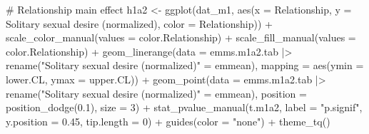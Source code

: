 \documentclass[
  bookmarksnumbered]{article}
\newenvironment{Shaded}{\begin{snugshade}}{\end{snugshade}}
\newcommand{\AttributeTok}[1]{\textcolor[rgb]{0.80,0.80,0.80}{#1}}
\newcommand{\CommentTok}[1]{\textcolor[rgb]{0.50,0.62,0.50}{#1}}
\newcommand{\DecValTok}[1]{\textcolor[rgb]{0.86,0.86,0.80}{#1}}
\newcommand{\FloatTok}[1]{\textcolor[rgb]{0.75,0.75,0.82}{#1}}
\newcommand{\FunctionTok}[1]{\textcolor[rgb]{0.94,0.94,0.56}{#1}}
\newcommand{\NormalTok}[1]{\textcolor[rgb]{0.80,0.80,0.80}{#1}}
\newcommand{\OtherTok}[1]{\textcolor[rgb]{0.94,0.94,0.56}{#1}}
\newcommand{\SpecialCharTok}[1]{\textcolor[rgb]{0.86,0.64,0.64}{#1}}
\newcommand{\StringTok}[1]{\textcolor[rgb]{0.80,0.58,0.58}{#1}}
\begin{document}
\begin{Shaded}
\begin{Highlighting}[]
\CommentTok{\# Relationship main effect}
\NormalTok{h1a2 }\OtherTok{\textless{}{-}} \FunctionTok{ggplot}\NormalTok{(dat\_m1, }\FunctionTok{aes}\NormalTok{(}\AttributeTok{x =}\NormalTok{ Relationship, }\AttributeTok{y =} \StringTok{\textasciigrave{}}\AttributeTok{Solitary sexual desire (normalized)}\StringTok{\textasciigrave{}}\NormalTok{, }
                          \AttributeTok{color =}\NormalTok{ Relationship)) }\SpecialCharTok{+}
  \FunctionTok{scale\_color\_manual}\NormalTok{(}\AttributeTok{values =}\NormalTok{ color.Relationship) }\SpecialCharTok{+}
  \FunctionTok{scale\_fill\_manual}\NormalTok{(}\AttributeTok{values =}\NormalTok{ color.Relationship) }\SpecialCharTok{+}
  \FunctionTok{geom\_linerange}\NormalTok{(}\AttributeTok{data =}\NormalTok{ emms.m1a2.tab }\SpecialCharTok{|\textgreater{}} 
                  \FunctionTok{rename}\NormalTok{(}\StringTok{"Solitary sexual desire (normalized)"} \OtherTok{=}\NormalTok{ emmean),}
                \AttributeTok{mapping =} \FunctionTok{aes}\NormalTok{(}\AttributeTok{ymin =}\NormalTok{ lower.CL, }\AttributeTok{ymax =}\NormalTok{ upper.CL)) }\SpecialCharTok{+}
  \FunctionTok{geom\_point}\NormalTok{(}\AttributeTok{data =}\NormalTok{ emms.m1a2.tab }\SpecialCharTok{|\textgreater{}} 
                  \FunctionTok{rename}\NormalTok{(}\StringTok{"Solitary sexual desire (normalized)"} \OtherTok{=}\NormalTok{ emmean), }
             \AttributeTok{position =} \FunctionTok{position\_dodge}\NormalTok{(}\FloatTok{0.1}\NormalTok{), }
             \AttributeTok{size =} \DecValTok{3}\NormalTok{) }\SpecialCharTok{+}
  \FunctionTok{stat\_pvalue\_manual}\NormalTok{(t.m1a2, }
                     \AttributeTok{label =} \StringTok{"p.signif"}\NormalTok{, }
                     \AttributeTok{y.position =} \FloatTok{0.45}\NormalTok{, }
                     \AttributeTok{tip.length =} \DecValTok{0}\NormalTok{) }\SpecialCharTok{+}
  \FunctionTok{guides}\NormalTok{(}\AttributeTok{color =} \StringTok{"none"}\NormalTok{) }\SpecialCharTok{+}
  \FunctionTok{theme\_tq}\NormalTok{()}


\end{Highlighting}
\end{Shaded}
\end{document}
